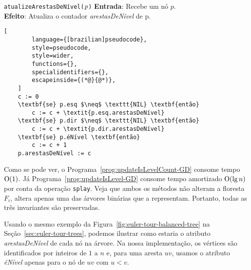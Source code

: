 \begin{programruledcaption}{\texttt{atualizeArestasDeNível($\emph{p}$)} \label{prog:updateIsLevelCount-GD}}
    \noindent\textbf{Entrada}: Recebe um nó $p$.\\
    \noindent\textbf{Efeito}: Atualiza o contador \textit{arestasDeNível} de p.
    \vspace{-0.5\baselineskip}
    \begin{lstlisting}[
        language={[brazilian]pseudocode},
        style=pseudocode,
        style=wider,
        functions={},
        specialidentifiers={},
        escapeinside={(*@}{@*)},
    ]
    c := 0
    \textbf{se} p.esq $\neq$ \texttt{NIL} \textbf{então}
        c := c + \textit{p.esq.arestasDeNível}
    \textbf{se} p.dir $\neq$ \texttt{NIL} \textbf{então}
        c := c + \textit{p.dir.arestasDeNível}
    \textbf{se} p.éNível \textbf{então}
        c := c + 1
    p.arestasDeNível := c
\end{lstlisting}
\vspace{-0.5\baselineskip}
\end{programruledcaption}


Como se pode ver, o Programa~\ref{prog:updateIsLevelCount-GD} consome tempo $\mathrm{O}(1)$. Já Programa~\ref{prog:updateIsLevel-GD} consome tempo amortizado $\mathrm{O}(\lg n)$ por conta da operação \texttt{splay}. Veja que ambos os métodos não alteram a floresta $F_i$, altera apenas uma das árvores binárias que a representam. Portanto, todas as três invariantes são preservadas.

Usando o mesmo exemplo da Figura~\ref{fig:euler-tour-balanced-tree} na Seção~\ref{sec:euler-tour-trees}, podemos ilustrar como estaria o atributo \textit{arestasDeNível} de cada nó na árvore. Na nossa implementação, os vértices são identificados por inteiros de $1$ a $n$ e, para uma aresta $uv$, usamos o atributo \textit{éNível} apenas para o nó de $uv$ com $u < v$.

